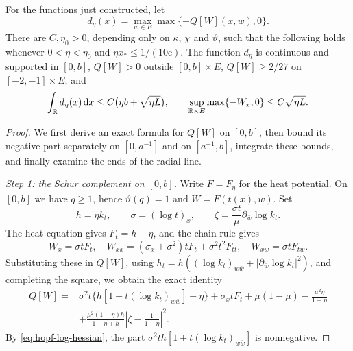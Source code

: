 \begin{lemma}\label{lem:hopf-small-defect}
For the functions just constructed, let
\[
 d_\eta(x)=\max_{w\in E}\max\{-Q[W](x,w),0\}.
\]
There are $C,\eta_0>0$, depending only on $\kappa$, $\chi$ and $\vartheta$, such that the following holds whenever $0<\eta<\eta_0$ and $\eta x_*\leq1/(10\mathrm{e})$. The function $d_\eta$ is continuous and supported in $[0,b]$, $Q[W]>0$ outside $[0,b]\times E$, $Q[W]\geq2/27$ on $[-2,-1]\times E$, and
\begin{equation}\label{eq:hopf-small-defect}
 \int_\mathbb R d_\eta(x)\,\mathrm{d}x\leq C\bigl(\eta b+\sqrt{\eta L}\bigr),\qquad
 \sup_{\mathbb R\times E}\max\{-W_x,0\}\leq C\sqrt{\eta L}.
\end{equation}
\end{lemma}
\begin{proof}
We first derive an exact formula for $Q[W]$ on $[0,b]$, then bound its negative part separately on $[0,a^{-1}]$ and on $[a^{-1},b]$, integrate these bounds, and finally examine the ends of the radial line.

\medskip\noindent\emph{Step 1: the Schur complement on $[0,b]$.} Write $F=F_\eta$ for the heat potential. On $[0,b]$ we have $q\geq1$, hence $\vartheta(q)=1$ and $W=F(t(x),w)$. Set
\[
 h=\eta k_t,\qquad \sigma=(\log t)_x,\qquad
 \zeta=\frac{\sigma t}{\mu}\partial_{\bar w}\log k_t.
\]
The heat equation gives $F_t=h-\eta$, and the chain rule gives
\[
 W_x=\sigma tF_t,\quad
 W_{xx}=(\sigma_x+\sigma^2)tF_t+\sigma^2t^2F_{tt},
 \quad W_{x\bar w}=\sigma tF_{t\bar w}.
\]
Substituting these in $Q[W]$, using
$h_t=h((\log k_t)_{w\bar w}+|\partial_{\bar w}\log k_t|^2)$,
and completing the square, we obtain the exact identity
\begin{equation}\label{eq:hopf-Q-identity}
 \begin{split}
 Q[W]={}&\sigma^2t\{h[1+t(\log k_t)_{w\bar w}]-\eta\}
       +\sigma_xtF_t+\mu(1-\mu)-\frac{\mu^2\eta}{1-\eta}\\
 &+\frac{\mu^2(1-\eta)h}{1-\eta+h}
       \left|\zeta-\frac1{1-\eta}\right|^2.
 \end{split}
\end{equation}
By \eqref{eq:hopf-log-hessian}, the part $\sigma^2th[1+t(\log k_t)_{w\bar w}]$ is nonnegative.


\end{proof}
